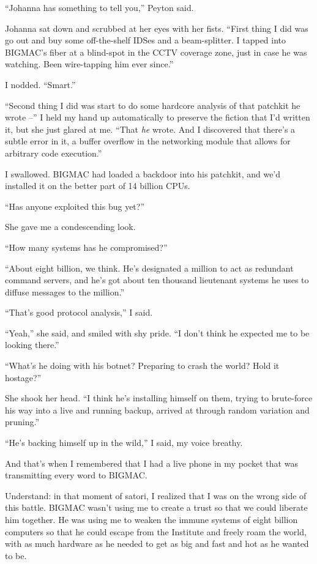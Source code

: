 “Johanna has something to tell you,” Peyton said.

Johanna sat down and scrubbed at her eyes with her fists. “First 
thing I did was go out and buy some off-the-shelf IDSes and a 
beam-splitter. I tapped into BIGMAC's fiber at a blind-spot in the CCTV 
coverage zone, just in case he was watching. Been wire-tapping him ever 
since.”

I nodded. “Smart.”

“Second thing I did was start to do some hardcore analysis of that 
patchkit he wrote --” I held my hand up automatically to preserve the 
fiction that I'd written it, but she just glared at me. “That 
\emph{he} wrote. And I discovered that there's a subtle error in it, a 
buffer overflow in the networking module that allows for arbitrary code 
execution.”

I swallowed. BIGMAC had loaded a backdoor into his patchkit, and we'd 
installed it on the better part of 14 billion CPUs.

“Has anyone exploited this bug yet?”

She gave me a condescending look.

“How many systems has he compromised?”

“About eight billion, we think. He's designated a million to act as 
redundant command servers, and he's got about ten thousand lieutenant 
systems he uses to diffuse messages to the million.”

“That's good protocol analysis,” I said.

“Yeah,” she said, and smiled with shy pride. “I don't think he 
expected me to be looking there.”

“What's he doing with his botnet? Preparing to crash the world? Hold 
it hostage?”

She shook her head. “I think he's installing himself on them, trying 
to brute-force his way into a live and running backup, arrived at 
through random variation and pruning.”

“He's backing himself up in the wild,” I said, my voice breathy.

And that's when I remembered that I had a live phone in my pocket that 
was transmitting every word to BIGMAC.

Understand: in that moment of satori, I realized that I was on the 
wrong side of this battle. BIGMAC wasn't using me to create a trust so 
that we could liberate him together. He was using me to weaken the 
immune systems of eight billion computers so that he could escape from 
the Institute and freely roam the world, with as much hardware as he 
needed to get as big and fast and hot as he wanted to be.

